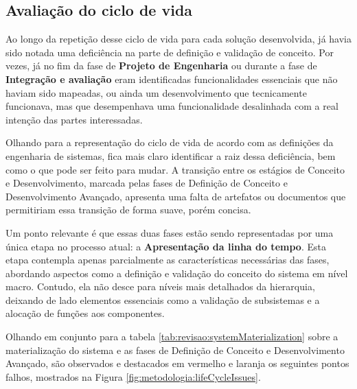 	\subsection{Avaliação do ciclo de vida}

	Ao longo da repetição desse ciclo de vida para cada solução desenvolvida, já havia sido notada uma deficiência na parte de definição e validação de conceito. Por vezes, já no fim da fase de \textbf{Projeto de Engenharia} ou durante a fase de \textbf{Integração e avaliação} eram identificadas funcionalidades essenciais que não haviam sido mapeadas, ou ainda um desenvolvimento que tecnicamente funcionava, mas que desempenhava uma funcionalidade desalinhada com a real intenção das partes interessadas.

	Olhando para a representação do ciclo de vida de acordo com as definições da engenharia de sistemas, fica mais claro identificar a raiz dessa deficiência, bem como o que pode ser feito para mudar. A transição entre os estágios de Conceito e Desenvolvimento, marcada pelas fases de Definição de Conceito e Desenvolvimento Avançado, apresenta uma falta de artefatos ou documentos que permitiriam essa transição de forma suave, porém concisa.

	Um ponto relevante é que essas duas fases estão sendo representadas por uma única etapa no processo atual: a \textbf{Apresentação da linha do tempo}. Esta etapa contempla apenas parcialmente as características necessárias das fases, abordando aspectos como a definição e validação do conceito do sistema em nível macro. Contudo, ela não desce para níveis mais detalhados da hierarquia, deixando de lado elementos essenciais como a validação de subsistemas e a alocação de funções aos componentes.

	Olhando em conjunto para a tabela \ref{tab:revisao:systemMaterialization} sobre a materialização do sistema e as fases de Definição de Conceito e Desenvolvimento Avançado, são observados e destacados em vermelho e laranja os seguintes pontos falhos, mostrados na Figura \ref{fig:metodologia:lifeCycleIssues}.

